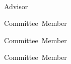 \thispagestyle{empty}
\begin{center}
    \spacedlowsmallcaps{\myName} \\ \medskip                        

    \begingroup
        \color{Maroon}\spacedallcaps{\myTitle}
    \endgroup
\end{center}        

\begin{flushright}
           Advisor\hspace{0.5cm}~\makebox[2in]{\hrulefill}
  
  Committee~Member\hspace{0.5cm}~\makebox[2in]{\hrulefill}
  
  Committee~Member\hspace{0.5cm}~\makebox[2in]{\hrulefill}
  
  Committee~Member\hspace{0.5cm}~\makebox[2in]{\hrulefill}
\end{flushright}


